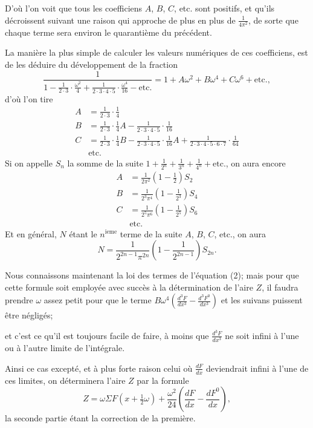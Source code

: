 \documentclass{article}
\begin{document}
D'où l'on voit que tous les coefficiens $A$, $B$, $C$, etc. sont positifs, et qu'ils décroissent suivant une raison qui approche de plus en plus de $\frac{1}{4\pi^{2}}$, de sorte que chaque terme sera environ le quarantième du précédent.

La manière la plus simple de calculer les valeurs numériques de ces coefficiens, est de les déduire du développement de la fraction
\[ \frac{1}{1-\frac{1}{2\cdot3}\cdot\frac{\omega^{2}}{4}+\frac{1}{2\cdot3\cdot4\cdot5}\cdot\frac{\omega^{4}}{16}-\text{etc.}}=1+A\omega^{2}+B\omega^{4}+C\omega^{6}+\text{etc.}, \]
d'où l'on tire
\[ \begin{aligned} A&=\frac{1}{2\cdot3}\cdot\frac{1}{4}\\ B&=\frac{1}{2\cdot3}\cdot\frac{1}{4}A-\frac{1}{2\cdot3\cdot4\cdot5}\cdot\frac{1}{16}\\ C&=\frac{1}{2\cdot3}\cdot\frac{1}{4}B-\frac{1}{2\cdot3\cdot4\cdot5}\cdot\frac{1}{16}A+\frac{1}{2\cdot3\cdot4\cdot5\cdot6\cdot7}\cdot\frac{1}{64}\\ &\text{etc.} \end{aligned} \]
Si on appelle $S_{n}$ la somme de la suite $1+\frac{1}{2^{n}}+\frac{1}{3^{n}}+\frac{1}{4^{n}}+\text{etc.}$, on aura encore
\[ \begin{aligned} A&=\frac{1}{2\pi^{2}}\left(1-\frac{1}{2}\right)S_{2}\\ B&=\frac{1}{2^{3}\pi^{4}}\left(1-\frac{1}{2^{3}}\right)S_{4}\\ C&=\frac{1}{2^{5}\pi^{6}}\left(1-\frac{1}{2^{5}}\right)S_{6}\\ &\text{etc.} \end{aligned} \]
Et en général, $N$ étant le $n^{\text{ieme}}$ terme de la suite $A$, $B$, $C$, etc., on aura
\[ N=\frac{1}{2^{2n-1}\pi^{2n}}\left(1-\frac{1}{2^{2n-1}}\right)S_{2n}. \]

Nous connaissons maintenant la loi des termes de l'équation (2); mais pour que cette formule soit employée avec succès à la détermination de l'aire $Z$, il faudra prendre $\omega$ assez petit pour que le terme $B\omega^{4}\left(\frac{d^{3}F}{dx^{3}}-\frac{d^{3}F^{0}}{dx^{3}}\right)$ et les suivans puissent être négligés;

et c'est ce qu'il est toujours facile de faire, à moins que $\frac{d^{3}F}{dx^{3}}$ ne soit infini à l'une ou à l'autre limite de l'intégrale.

Ainsi ce cas excepté, et à plus forte raison celui où $\frac{dF}{dx}$ deviendrait infini à l'une de ces limites, on déterminera l'aire $Z$ par la formule
\[ Z=\omega\Sigma F(x+\tfrac{1}{2}\omega)+\frac{\omega^{2}}{24}\left(\frac{dF}{dx}-\frac{dF^{0}}{dx}\right), \]
la seconde partie étant la correction de la première.
\end{document}
